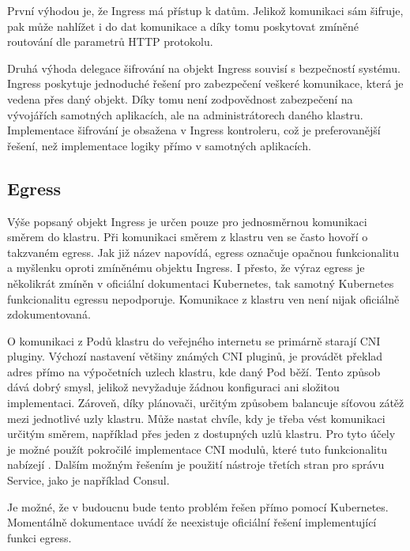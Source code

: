 První výhodou je, že Ingress má přístup k datům. Jelikož komunikaci sám šifruje, pak může nahlížet i do dat komunikace a díky tomu poskytovat zmíněné routování dle parametrů HTTP protokolu.

Druhá výhoda delegace šifrování na objekt Ingress souvisí s bezpečností systému. Ingress poskytuje jednoduché řešení pro zabezpečení veškeré komunikace, která je vedena přes daný objekt. Díky tomu není zodpovědnost zabezpečení na vývojářích samotných aplikacích, ale na administrátorech daného klastru. Implementace  šifrování je obsažena v Ingress kontroleru, což je preferovanější řešení, než implementace logiky přímo v samotných aplikacích. \cite{koke_2023_bezpen}

\subsection{Egress}
Výše popsaný objekt Ingress je určen pouze pro jednosměrnou komunikaci směrem do klastru. Při komunikaci směrem z klastru ven se často hovoří o takzvaném egress. Jak již název napovídá, egress označuje opačnou funkcionalitu a myšlenku oproti zmíněnému objektu Ingress. I přesto, že výraz egress je několikrát zmíněn v oficiální dokumentaci Kubernetes, tak samotný Kubernetes funkcionalitu egressu nepodporuje. Komunikace z klastru ven není nijak oficiálně zdokumentovaná.

O komunikaci z Podů klastru do veřejného internetu se primárně starají CNI pluginy. Výchozí nastavení většiny známých CNI pluginů, je provádět překlad adres přímo na výpočetních uzlech klastru, kde daný Pod běží. Tento způsob dává dobrý smysl, jelikož nevyžaduje žádnou konfiguraci ani složitou implementaci. Zároveň, díky plánovači, určitým způsobem balancuje síťovou zátěž mezi jednotlivé uzly klastru. Může nastat chvíle, kdy je třeba vést komunikaci určitým směrem, například přes jeden z dostupných uzlů klastru. Pro tyto účely je možné použít pokročilé implementace CNI modulů, které tuto funkcionalitu nabízejí \cite{yamamoto_2020_introducing}. Dalším možným řešením je použití nástroje třetích stran pro správu Service, jako je například Consul.

Je možné, že v budoucnu bude tento problém řešen přímo pomocí Kubernetes. Momentálně dokumentace uvádí že neexistuje oficiální řešení implementující funkci egress. \cite{thekubernetesauthors_2022_network}


